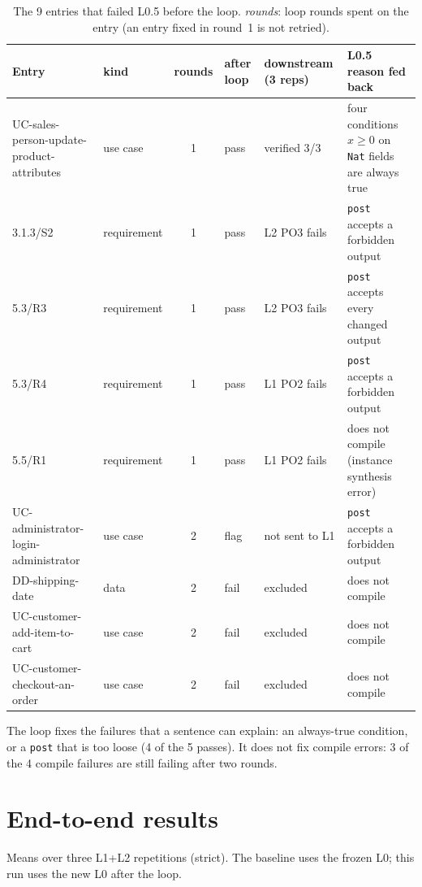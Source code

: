 \documentclass[10pt,a4paper]{article}
\newcommand{\code}[1]{\texttt{\small #1}}
\begin{document}
\begin{table}[h]
\centering\small
\setlength{\tabcolsep}{4pt}
\begin{tabularx}{\linewidth}{@{}llcllX@{}}
\toprule
Entry & kind & rounds & after loop & downstream (3 reps) & L0.5 reason fed back \\
\midrule
UC-sales-person-update-product-attributes & use case & 1 & \textcolor{okgreen}{pass} & \textcolor{okgreen}{verified 3/3}
   & four conditions $x \geq 0$ on \code{Nat} fields are always true \\
3.1.3/S2 & requirement & 1 & \textcolor{okgreen}{pass} & \textcolor{failred}{L2 PO3 fails}  & \code{post} accepts a forbidden output \\
5.3/R3   & requirement & 1 & \textcolor{okgreen}{pass} & \textcolor{failred}{L2 PO3 fails}  & \code{post} accepts every changed output \\
5.3/R4   & requirement & 1 & \textcolor{okgreen}{pass} & \textcolor{failred}{L1 PO2 fails}  & \code{post} accepts a forbidden output \\
5.5/R1   & requirement & 1 & \textcolor{okgreen}{pass} & \textcolor{failred}{L1 PO2 fails}  & does not compile (instance synthesis error) \\
UC-administrator-login-administrator & use case & 2 & \textcolor{weakamber}{flag} & not sent to L1 & \code{post} accepts a forbidden output \\
DD-shipping-date               & data   & 2 & \textcolor{failred}{fail} & excluded & does not compile \\
UC-customer-add-item-to-cart   & use case & 2 & \textcolor{failred}{fail} & excluded & does not compile \\
UC-customer-checkout-an-order  & use case & 2 & \textcolor{failred}{fail} & excluded & does not compile \\
\bottomrule
\end{tabularx}
\caption{The 9 entries that failed L0.5 before the loop. \emph{rounds}: loop rounds spent on the entry (an entry fixed in
round~1 is not retried).}
\label{tab:entries}
\end{table}

The loop fixes the failures that a sentence can explain: an always-true condition, or a \code{post} that is too loose (4 of
the 5 passes). It does not fix compile errors: 3 of the 4 compile failures are still failing after two rounds.

\section{End-to-end results}
Means over three L1+L2 repetitions (strict). The baseline uses the frozen L0; this run uses the new L0 after the loop.
\end{document}
